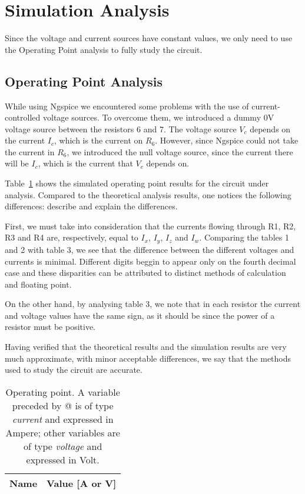 \section{Simulation Analysis}
\label{sec:simulation}
\tab Since the voltage and current sources have constant values, we only need to use the Operating Point analysis to fully study the circuit.

\subsection{Operating Point Analysis}

\tab While using Ngspice we encountered some problems with the use of current-controlled voltage sources. To overcome them, we introduced a dummy 0V voltage source between the resistors 6 and 7.
The voltage source $V_c$ depends on the current $I_c$, which is the current on $R_6$. However, since Ngspice could not take the current in $R_6$, we introduced the null voltage source, since the current there will be $I_c$, which is the current that $V_c$ depends on.

Table~\ref{tab:op} shows the simulated operating point results for the circuit
under analysis. Compared to the theoretical analysis results, one notices the
following differences: describe and explain the differences.

First, we must take into consideration that the currents flowing through R1, R2, R3 and R4 are, respectively, equal to $I_x$, $I_y$, $I_z$ and $I_w$.
Comparing the tables 1 and 2 with table 3, we see that the difference between the different voltages and currents is minimal. Different digits beggin to appear only on the fourth decimal case and these disparities can be attributed to distinct methods of calculation and floating point.\par
On the other hand, by analysing table 3, we note that in each resistor the current and voltage values have the same sign, as it should be since the power of a resistor must be positive. \par
Having verified that the theoretical results and the simulation results are very much approximate, with minor acceptable differences, we say that the methods used to study the circuit are accurate.


\begin{table}[h]
  \centering
  \begin{tabular}{|l|r|}
    \hline    
    {\bf Name} & {\bf Value [A or V]} \\ \hline
    
  \end{tabular}
  \caption{Operating point. A variable preceded by @ is of type {\em current}
    and expressed in Ampere; other variables are of type {\it voltage} and expressed in
    Volt.}
  \label{tab:op}
\end{table}




